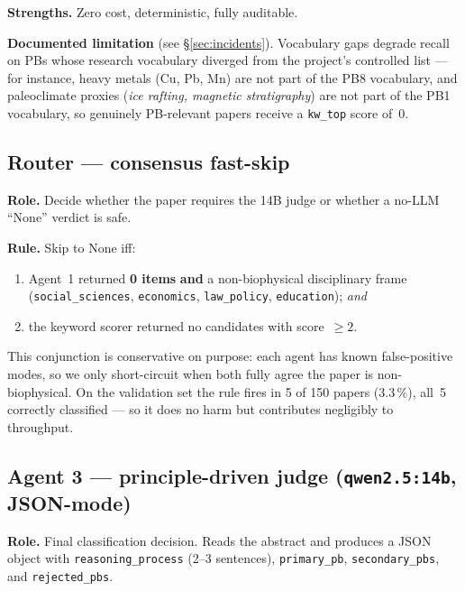 \documentclass[11pt,a4paper]{article}
\begin{document}
\textbf{Strengths.} Zero cost, deterministic, fully auditable.

\textbf{Documented limitation} (see \S\ref{sec:incidents}). Vocabulary gaps degrade recall on PBs whose research vocabulary diverged from the project's controlled list --- for instance, heavy metals (Cu, Pb, Mn) are not part of the PB8 vocabulary, and paleoclimate proxies (\emph{ice rafting, magnetic stratigraphy}) are not part of the PB1 vocabulary, so genuinely PB-relevant papers receive a \texttt{kw\_top} score of~0.

\subsection{Router --- consensus fast-skip}

\textbf{Role.} Decide whether the paper requires the 14B judge or whether a no-LLM ``None'' verdict is safe.

\textbf{Rule.} Skip to None iff:
\begin{enumerate}\itemsep0pt
\item Agent~1 returned \textbf{0 items} \textbf{and} a non-biophysical disciplinary frame (\texttt{social\_sciences}, \texttt{economics}, \texttt{law\_policy}, \texttt{education}); \emph{and}
\item the keyword scorer returned no candidates with score~$\geq 2$.
\end{enumerate}

This conjunction is conservative on purpose: each agent has known false-positive modes, so we only short-circuit when both fully agree the paper is non-biophysical. On the validation set the rule fires in 5 of 150 papers ($3.3\,\%$), all~5 correctly classified --- so it does no harm but contributes negligibly to throughput.

\subsection{Agent 3 --- principle-driven judge (\texttt{qwen2.5:14b}, JSON-mode)}

\textbf{Role.} Final classification decision. Reads the abstract and produces a JSON object with \texttt{reasoning\_process} (2--3 sentences), \texttt{primary\_pb}, \texttt{secondary\_pbs}, and \texttt{rejected\_pbs}.
\end{document}
